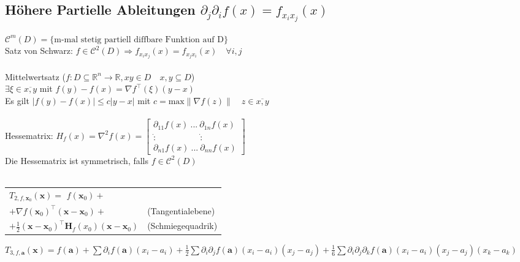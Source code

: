 \documentclass[6pt,a4paper]{scrartcl}
\let\olddot = \dot
\newcommand{\eset}[1]{\ensuremath{\bigl\{#1\bigr\}}}											%
\newcommand{\norm}[1]{\ensuremath{\|#1\|}}														%
\newcommand{\ma}[1]{\ensuremath{\boldsymbol {#1}}}												%
\newcommand{\svdots}{\ensuremath{\olddot :}}													%
\renewcommand{\vec}[1]{\ensuremath{\boldsymbol {#1}}}											%
\renewcommand*{\dot}[1]{\accentset{\mbox{\textrm{\large\bfseries .}} }{#1}}						%
\begin{document}
\begin{multicols*}{4}
\subsection{Höhere Partielle Ableitungen $\partial_j \partial_i f(x) = f_{x_i x_j} (x)$}
$\mathcal C^m (D) = \eset{\text{m-mal stetig partiell diffbare Funktion auf D}}$\\
Satz von Schwarz: $f \in \mathcal C^2 (D) \Rightarrow f_{x_i x_j} (x)= f_{x_j x_i} (x) \quad \forall i,j$\\
\\
Mittelwertsatz ($f:D\subseteq \mathbb R^n \rightarrow \mathbb R, xy \in D \quad x,y \subseteq D$)\\
$\exists \xi \in \overline{x,y}$ mit $f(y)-f(x)=\nabla f^\top (\xi)(y-x)$\\
Es gilt $|f(y) - f(x)| \le c|y-x|$ mit $c= \mathrm{max} \norm{\nabla f(z)} \quad z \in \overline{x,y}$\\
\\
Hessematrix: $H_f (x) = \nabla^2 f(x) = \begin{bmatrix} \partial_{11} f(x)\ ...\ \partial_{1n} f(x) \\ \svdots \quad \qquad \qquad \svdots \\ \partial_{n1} f(x)\ ...\ \partial_{nn} f(x) \end{bmatrix}$\\
Die Hessematrix ist symmetrisch, falls $f \in \mathcal C^2(D)$\\
\\ 
\begin{tabular}{ll}
	$T_{2,f, \vec x_0} (\vec x) =$ $f(\vec x_0) +$ \\
	\qquad $+ \nabla f(\vec x_0)^\top (\vec x-\vec x_0) +$ & (Tangentialebene)\\
	\qquad $+ \frac{1}{2}(\vec x-\vec x_0)^\top \ma H_f(x_0)(\vec x- \vec x_0)$ & (Schmiegequadrik)\\
\end{tabular}

$T_{3,f,\vec a}(\vec x) = f(\vec a) + \sum \partial_i f(\vec a)(x_i - a_i) + \frac{1}{2} \sum \partial_i \partial_j f(\vec a)(x_i - a_i)(x_j - a_j) + \frac{1}{6} \sum \partial_i \partial_j \partial_k f(\vec a)(x_i - a_i)(x_j - a_j)(x_k - a_k)$


\end{multicols*}
\end{document}
